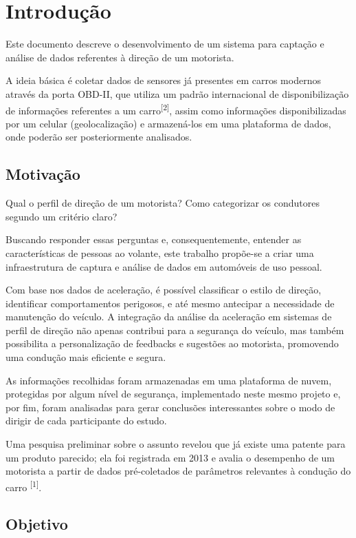 \chapter{Introdução}\label{CAP:introducao}

Este documento descreve o desenvolvimento de um sistema para captação e análise de dados referentes à direção de um motorista.

A ideia básica é coletar dados de sensores já presentes em carros modernos através da porta OBD-II, que utiliza um padrão internacional de disponibilização de informações referentes a um carro\textsuperscript{[2]}, assim como informações disponibilizadas por um celular (geolocalização) e armazená-los em uma plataforma de dados, onde poderão ser posteriormente analisados.

\section{Motivação}

Qual o perfil de direção de um motorista? Como categorizar os condutores segundo um critério claro?

Buscando responder essas perguntas e, consequentemente, entender as características de pessoas ao volante, este trabalho propõe-se a criar uma infraestrutura de captura e análise de dados em automóveis de uso pessoal.

Com base nos dados de aceleração, é possível classificar o estilo de direção, identificar comportamentos perigosos, e até mesmo antecipar a necessidade de manutenção do veículo. A integração da análise da aceleração em sistemas de perfil de direção não apenas contribui para a segurança do veículo, mas também possibilita a personalização de feedbacks e sugestões ao motorista, promovendo uma condução mais eficiente e segura.

As informações recolhidas foram armazenadas em uma plataforma de nuvem, protegidas por algum nível de segurança, implementado neste mesmo projeto e, por fim, foram analisadas para gerar conclusões interessantes sobre o modo de dirigir de cada participante do estudo.
	
Uma pesquisa preliminar sobre o assunto revelou que já existe uma patente para um produto parecido; ela foi registrada em 2013 e avalia o desempenho de um motorista a partir de dados pré-coletados de parâmetros relevantes à condução do carro \textsuperscript{[1]}.

\section{Objetivo}

